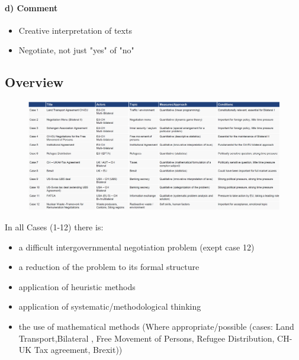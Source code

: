 \paragraph{d) Comment}

\begin{itemize}
    \item Creative interpretation of texts
    \item Negotiate, not just "yes" of "no"
\end{itemize}

\subsection{Overview}

\begin{figure}[h]
    \centering
    \includegraphics[width=1.05\textwidth]{Pictures/Overview_Case_studies.png}
\end{figure}

\pagebreak

In all Cases (1-12) there is:
\begin{itemize}
    \item a difficult intergovernmental negotiation problem (exept case 12)
    \item a reduction of the problem to its formal structure
    \item application of heuristic methods
    \item application of systematic/methodological thinking
    \item the use of mathematical methods (Where appropriate/possible (cases:
        Land Transport,Bilateral , Free Movement of Persons, Refugee
        Distribution, CH-UK Tax agreement, Brexit))
\end{itemize}
